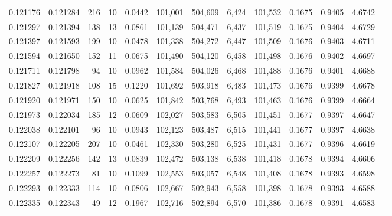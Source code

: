 \begin{tabular}{rrrrrrrrrrrrr}
0.121176 & 0.121284 &   216 &  10 &                                     0.0442 & 101,001 & 504,609 &   6,424 & 101,532 & 0.1675 & 0.9405 & 4.6742 \\
0.121297 & 0.121394 &   138 &  13 &                                     0.0861 & 101,139 & 504,471 &   6,437 & 101,519 & 0.1675 & 0.9404 & 4.6729 \\
0.121397 & 0.121593 &   199 &  10 &                                     0.0478 & 101,338 & 504,272 &   6,447 & 101,509 & 0.1676 & 0.9403 & 4.6711 \\
0.121594 & 0.121650 &   152 &  11 &                                     0.0675 & 101,490 & 504,120 &   6,458 & 101,498 & 0.1676 & 0.9402 & 4.6697 \\
0.121711 & 0.121798 &    94 &  10 &                                     0.0962 & 101,584 & 504,026 &   6,468 & 101,488 & 0.1676 & 0.9401 & 4.6688 \\
0.121827 & 0.121918 &   108 &  15 &                                     0.1220 & 101,692 & 503,918 &   6,483 & 101,473 & 0.1676 & 0.9399 & 4.6678 \\
0.121920 & 0.121971 &   150 &  10 &                                     0.0625 & 101,842 & 503,768 &   6,493 & 101,463 & 0.1676 & 0.9399 & 4.6664 \\
0.121973 & 0.122034 &   185 &  12 &                                     0.0609 & 102,027 & 503,583 &   6,505 & 101,451 & 0.1677 & 0.9397 & 4.6647 \\
0.122038 & 0.122101 &    96 &  10 &                                     0.0943 & 102,123 & 503,487 &   6,515 & 101,441 & 0.1677 & 0.9397 & 4.6638 \\
0.122107 & 0.122205 &   207 &  10 &                                     0.0461 & 102,330 & 503,280 &   6,525 & 101,431 & 0.1677 & 0.9396 & 4.6619 \\
0.122209 & 0.122256 &   142 &  13 &                                     0.0839 & 102,472 & 503,138 &   6,538 & 101,418 & 0.1678 & 0.9394 & 4.6606 \\
0.122257 & 0.122273 &    81 &  10 &                                     0.1099 & 102,553 & 503,057 &   6,548 & 101,408 & 0.1678 & 0.9393 & 4.6598 \\
0.122293 & 0.122333 &   114 &  10 &                                     0.0806 & 102,667 & 502,943 &   6,558 & 101,398 & 0.1678 & 0.9393 & 4.6588 \\
0.122335 & 0.122343 &    49 &  12 &                                     0.1967 & 102,716 & 502,894 &   6,570 & 101,386 & 0.1678 & 0.9391 & 4.6583 \\

\end{tabular}
